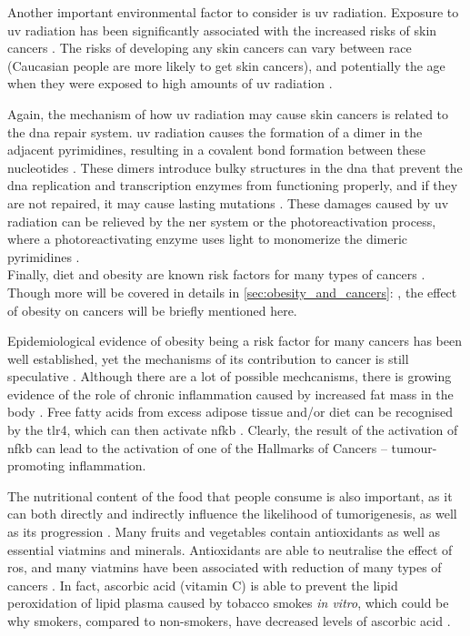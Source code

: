 \noindent
Another important environmental factor to consider is \gls{uv} radiation.
Exposure to \gls{uv} radiation has been significantly associated with the increased risks of skin cancers \citep{Armstrong2001,Gallagher2006}.
The risks of developing any skin cancers can vary between race (Caucasian people are more likely to get skin cancers), and potentially the age when they were exposed to high amounts of \gls{uv} radiation \citep{Armstrong2001,Gallagher2006}.

Again, the mechanism of how \gls{uv} radiation may cause  skin cancers is related to the \acrshort{dna} repair system.
\gls{uv} radiation causes the formation of a dimer in the adjacent pyrimidines, resulting in a covalent bond formation between these nucleotides \citep{Friedberg2003,Hoeijmakers2001}.
These dimers introduce bulky structures in the \acrshort{dna} that prevent the \acrshort{dna} replication and transcription enzymes from functioning properly, and if they are not repaired, it may cause lasting mutations \citep{Friedberg2003,Hoeijmakers2001}.
These damages caused by \gls{uv} radiation can be relieved by the \gls{ner} system or the photoreactivation process, where a photoreactivating enzyme uses light to monomerize the dimeric pyrimidines \citep{Friedberg2003}.
\\

\noindent
Finally, diet and obesity are known risk factors for many types of cancers \citep{Ames1995a,Calle2004}.
Though more will be covered in details in \cref{sec:obesity_and_cancers}: , the effect of obesity on cancers will be briefly mentioned here.

Epidemiological evidence of obesity being a risk factor for many cancers has been well established, yet the mechanisms of its contribution to cancer is still  speculative \citep{Calle2003,Kelesidis2006a}.
Although there are a lot of possible mechcanisms, there is growing evidence of the role of chronic inflammation caused by increased fat mass in the body \citep{Kelesidis2006a,Lumeng2011,Hernandez2013}.
Free fatty acids from excess adipose tissue and/or diet can be recognised by the \gls{tlr}4, which can then activate \gls{nfkb} \citep{Lumeng2011}.
Clearly, the result of the activation of \gls{nfkb} can lead to the activation of one of the Hallmarks of Cancers -- tumour-promoting inflammation.

The nutritional content of the food that people consume is also important, as it can both directly and indirectly influence the likelihood of tumorigenesis, as well as its progression \citep{Ames1995a}.
Many fruits and vegetables contain antioxidants as well as essential viatmins and minerals.
Antioxidants are able to neutralise the effect of \gls{ros},  and many viatmins have been associated with reduction of many types of cancers \citep{Ames1995a}.
In fact, ascorbic acid (vitamin C) is able to prevent the lipid peroxidation of lipid plasma caused by tobacco smokes \textit{in vitro}, which could be why smokers, compared to non-smokers, have decreased levels of ascorbic acid \citep{Hecht1999}.

